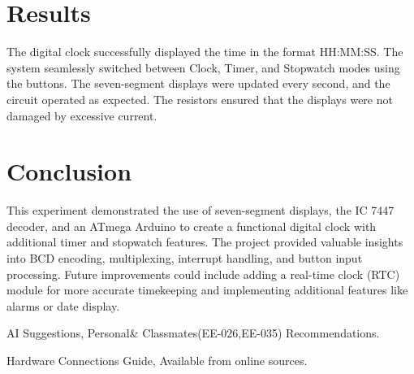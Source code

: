 \documentclass[journal]{IEEEtran}
\begin{document}
\section{Results}
The digital clock successfully displayed the time in the format HH:MM:SS. The system seamlessly switched between Clock, Timer, and Stopwatch modes using the buttons. The seven-segment displays were updated every second, and the circuit operated as expected. The resistors ensured that the displays were not damaged by excessive current.

\section{Conclusion}
This experiment demonstrated the use of seven-segment displays, the IC 7447 decoder, and an ATmega Arduino to create a functional digital clock with additional timer and stopwatch features. The project provided valuable insights into BCD encoding, multiplexing, interrupt handling, and button input processing. Future improvements could include adding a real-time clock (RTC) module for more accurate timekeeping and implementing additional features like alarms or date display.
\begin{thebibliography}{9}

 AI Suggestions, Personal& Classmates(EE-026,EE-035) Recommendations.

 Hardware Connections Guide, Available from online sources.

\end{thebibliography}
\end{document}

